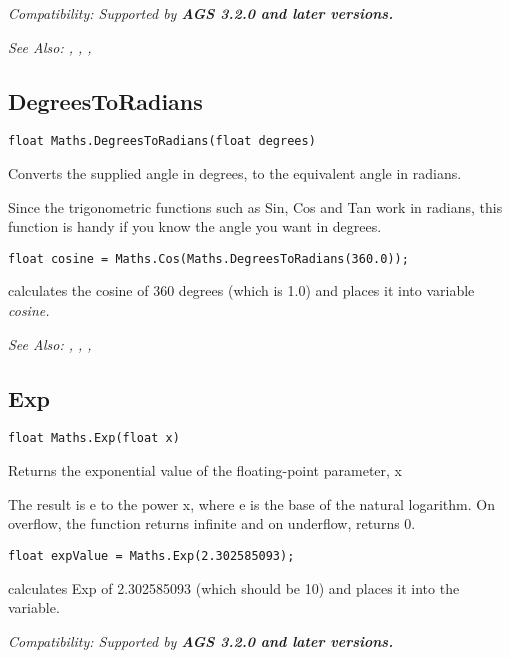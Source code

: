 \it{Compatibility:} Supported by \bf{AGS 3.2.0} and later versions.

\it{See Also:} ,
,
, 


\subsection{DegreesToRadians}\label{Maths.DegreesToRadians}%

\begin{verbatim}
float Maths.DegreesToRadians(float degrees)
\end{verbatim}
Converts the supplied angle in degrees, to the equivalent angle in radians.

Since the trigonometric functions such as Sin, Cos and Tan work in radians, this
function is handy if you know the angle you want in degrees.

\begin{verbatim}
float cosine = Maths.Cos(Maths.DegreesToRadians(360.0));
\end{verbatim}
calculates the cosine of 360 degrees (which is 1.0) and places it into variable \it{cosine}.

\it{See Also:} ,
,
, 


\subsection{Exp}\label{Maths.Exp}%

\begin{verbatim}
float Maths.Exp(float x)
\end{verbatim}
Returns the exponential value of the floating-point parameter, x

The result is e to the power x, where e is the base of the natural logarithm.
On overflow, the function returns infinite and on underflow, returns 0.

\begin{verbatim}
float expValue = Maths.Exp(2.302585093);
\end{verbatim}
calculates Exp of 2.302585093 (which should be 10) and places it into the variable.

\it{Compatibility:} Supported by \bf{AGS 3.2.0} and later versions.

